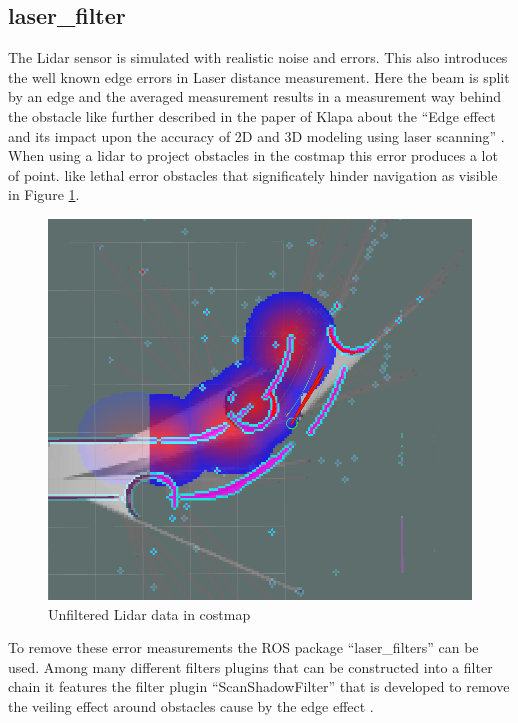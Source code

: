 \subsection{laser\_filter}


The Lidar sensor is simulated with realistic noise and errors. This also introduces the well known edge errors in Laser distance measurement. Here the beam is split by an edge and the averaged measurement results in a measurement way behind the obstacle like further described in the paper of Klapa about the ``Edge effect and its impact upon the accuracy of 2D and 3D modeling using laser scanning'' \cite{edgeeffect}.\\

When using a lidar to project obstacles in the costmap this error produces a lot of point. like lethal error obstacles that significately hinder navigation as visible in Figure \ref{unfiltered lidar}.

\begin{figure}[H]
	\includegraphics[width=\textwidth]{Pictures/Needs filtering of Laser}
	\caption{Unfiltered Lidar data in costmap}
	\label{unfiltered lidar}
\end{figure}

To remove these error measurements the ROS package ``laser\_filters'' can be used. Among many different filters plugins that can be constructed into a filter chain it features the filter plugin ``ScanShadowFilter'' that is developed to remove the veiling effect around obstacles cause by the edge effect \cite{laserfilters}.

